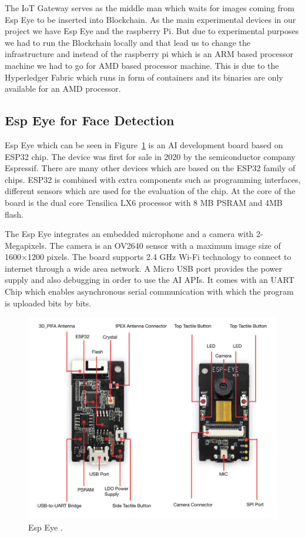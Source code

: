 The IoT Gateway serves as the middle man which waits for images coming from Esp Eye to be inserted into Blockchain. As the main experimental devices in our project we have Esp Eye and the raspberry Pi. But due to experimental purposes we had to run the Blockchain locally and that lead us to change the infrastructure and instead of the raspberry pi which is an ARM based processor machine we had to go for AMD based processor machine. This is due to the Hyperledger Fabric which runs in form of containers and its binaries are only available for an AMD processor. 


\subsection{Esp Eye for Face Detection}

Esp Eye which can be seen in Figure~\ref{fig:espeye} is an AI development board based on ESP32 chip. The device was first for sale in 2020 by the semiconductor company Espressif. There are many other devices which are based on the ESP32 family of chips. ESP32 is combined with extra components such as programming interfaces, different sensors which are used for the evaluation of the chip. 
At the core of the board is the dual core Tensilica LX6 processor with 8 MB PSRAM and 4MB flash. 

The Esp Eye integrates an embedded microphone and a camera with 2-Megapixels. The camera is an OV2640 sensor with a maximum image size of 1600×1200 pixels. The board supports  2.4 GHz Wi-Fi technology to connect to internet through a wide area network. A Micro USB port provides the power supply and also debugging in order to use the AI APIs. It comes with an UART Chip which enables asynchronous serial communication with which the program is uploaded bits by bits. 
\begin{figure}[!htb]
    \centering
    \includegraphics[width=1\textwidth]{figures/espeye.png}
    \caption{Esp Eye \cite{espeyeimage}.}
    \label{fig:espeye}
\end{figure}


